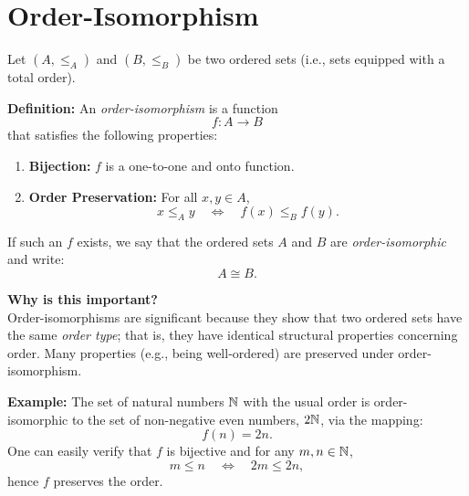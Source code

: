 \documentclass[12pt]{article}
\theoremstyle{definition} %
\theoremstyle{plain} %
\begin{document}
\section*{Order-Isomorphism}

Let \((A, \le_A)\) and \((B, \le_B)\) be two ordered sets (i.e., sets equipped with a total order).

\medskip

\textbf{Definition:} An \emph{order-isomorphism} is a function 
\[
    f : A \longrightarrow B
\]
that satisfies the following properties:
\begin{enumerate}
    \item \textbf{Bijection:} \(f\) is a one-to-one and onto function.
    \item \textbf{Order Preservation:} For all \(x,y \in A\), 
          \[
             x \le_A y \quad\Longleftrightarrow\quad f(x) \le_B f(y).
          \]
\end{enumerate}
If such an \(f\) exists, we say that the ordered sets \(A\) and \(B\) are \emph{order-isomorphic} and write:
\[
    A \cong B.
\]

\medskip

\textbf{Why is this important?}\\[4pt]
Order-isomorphisms are significant because they show that two ordered sets have the same \emph{order type}; that is, they have identical structural properties concerning order. Many properties (e.g., being well-ordered) are preserved under order-isomorphism.

\bigskip

\textbf{Example:} The set of natural numbers \(\Bbb{N}\) with the usual order is order-isomorphic to the set of non-negative even numbers, \(2\Bbb{N}\), via the mapping:
\[
    f(n)=2n.
\]
One can easily verify that \(f\) is bijective and for any \(m, n\in \Bbb{N}\),
\[
    m \le n \quad\Longleftrightarrow\quad 2m \le 2n,
\]
hence \(f\) preserves the order.
\end{document}
